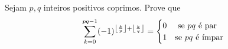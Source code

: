 Sejam \(\displaystyle{p,q}\) inteiros positivos coprimos. Prove que
\[\displaystyle{ \sum_{k=0}^{pq-1} (-1)^{\left\lfloor \frac{k}{p}\right\rfloor + \left\lfloor \frac{k}{q}\right\rfloor}  = \begin{cases} 0 & \textnormal{ se } pq  \textnormal{ é par}\\ 1 &  \textnormal{se } pq \textnormal{ é ímpar}\end{cases}}\]
